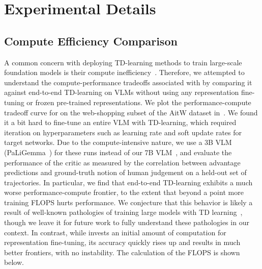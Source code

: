 \section{Experimental Details}

\vspace{-0.2cm}
\subsection{Compute Efficiency Comparison}\label{app:compute_efficiency}
\vspace{-0.2cm}

A common concern with deploying TD-learning methods to train large-scale foundation models is their compute inefficiency~\citep{abdulhai2023lmrlgymbenchmarksmultiturn,chebotar2023qtransformerscalableofflinereinforcement}. Therefore, we attempted to understand the compute-performance tradeoffs associated with \ourmethod{}  by comparing it against end-to-end TD-learning on VLMs without using any representation fine-tuning or frozen pre-trained representations.  We plot the performance-compute tradeoff curve for \ourmethod{} on the web-shopping subset of the AitW dataset in~. We found it a bit hard to fine-tune an entire VLM with TD-learning, which required iteration on hyperparameters such as learning rate and soft update rates for target networks. Due to the compute-intensive nature, we use a 3B VLM (PaLiGemma~\citep{beyer2024paligemmaversatile3bvlm}) for these runs instead of our 7B VLM~\citep{liu2024llavanext}, and evaluate the performance of the critic as measured by the correlation between advantage predictions and ground-truth notion of human judgement on a held-out set of trajectories.  
In particular, we find that end-to-end TD-learning exhibits a much worse performance-compute frontier, to the extent that beyond a point more training FLOPS hurts performance. We conjecture that this behavior is likely a result of well-known pathologies of training large models with TD learning~\citep{kumar2022offline}, though we leave it for future work to fully understand these pathologies in our context. In contrast, while \ourmethod{} invests an initial amount of computation for representation fine-tuning, its accuracy quickly rises up and results in much better frontiers, with no instability. The calculation of the FLOPS is shown below.


